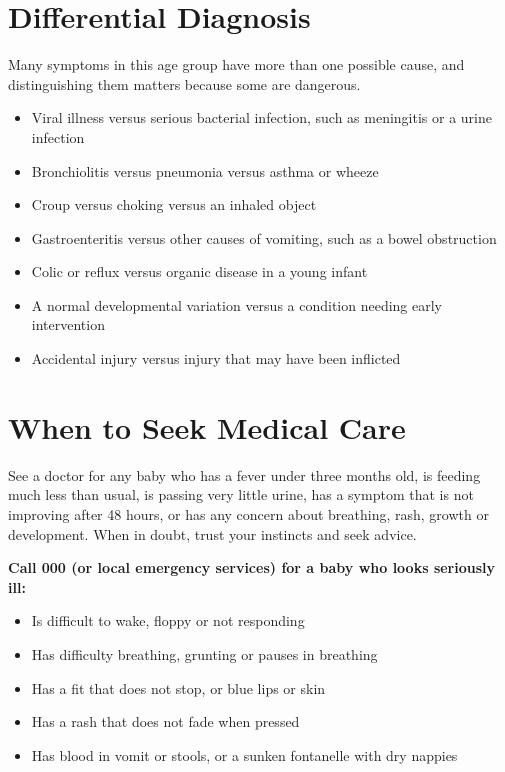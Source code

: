 \section*{Differential Diagnosis}
Many symptoms in this age group have more than one possible cause, and distinguishing them matters because some are dangerous.

\begin{itemize}
    \item Viral illness versus serious bacterial infection, such as meningitis or a urine infection
    \item Bronchiolitis versus pneumonia versus asthma or wheeze
    \item Croup versus choking versus an inhaled object
    \item Gastroenteritis versus other causes of vomiting, such as a bowel obstruction
    \item Colic or reflux versus organic disease in a young infant
    \item A normal developmental variation versus a condition needing early intervention
    \item Accidental injury versus injury that may have been inflicted
\end{itemize}

\section*{When to Seek Medical Care}
See a doctor for any baby who has a fever under three months old, is feeding much less than usual, is passing very little urine, has a symptom that is not improving after 48 hours, or has any concern about breathing, rash, growth or development. When in doubt, trust your instincts and seek advice.

\textbf{Call 000 (or local emergency services) for a baby who looks seriously ill:}
\begin{itemize}
    \item Is difficult to wake, floppy or not responding
    \item Has difficulty breathing, grunting or pauses in breathing
    \item Has a fit that does not stop, or blue lips or skin
    \item Has a rash that does not fade when pressed
    \item Has blood in vomit or stools, or a sunken fontanelle with dry nappies
\end{itemize}

